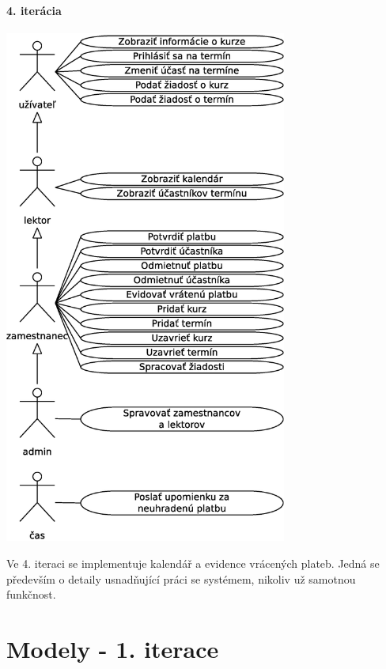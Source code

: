 \documentclass[12pt,a4paper,titlepage,final]{report}
\begin{document}
	\subsubsection{4. iterácia}
		\begin{center}
			\captionsetup{type=figure}
			\includegraphics[height=17cm]{img/use_case.eps}
		\end{center}
		
Ve 4. iteraci se implementuje kalendář a evidence vrácených plateb. Jedná se především o detaily usnadňující práci se systémem, nikoliv už samotnou funkčnost.





\chapter{Modely - 1. iterace}
\end{document}
